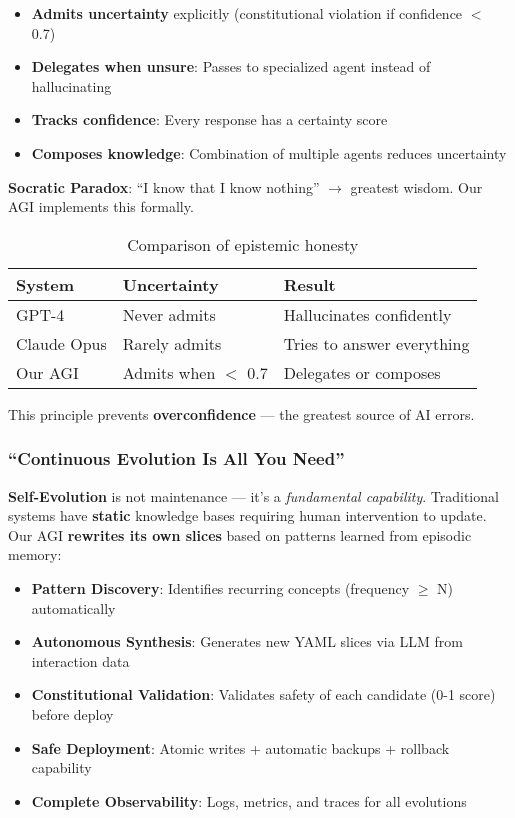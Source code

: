 \documentclass[11pt]{article}
\begin{document}
\begin{itemize}
    \item \textbf{Admits uncertainty} explicitly (constitutional violation if confidence $<$ 0.7)
    \item \textbf{Delegates when unsure}: Passes to specialized agent instead of hallucinating
    \item \textbf{Tracks confidence}: Every response has a certainty score
    \item \textbf{Composes knowledge}: Combination of multiple agents reduces uncertainty
\end{itemize}

\textbf{Socratic Paradox}: ``I know that I know nothing'' $\rightarrow$ greatest wisdom. Our AGI implements this formally.

\begin{table}[H]
\centering
\begin{tabular}{@{}lll@{}}
\toprule
\textbf{System} & \textbf{Uncertainty} & \textbf{Result} \\ \midrule
GPT-4 & Never admits & Hallucinates confidently \\
Claude Opus & Rarely admits & Tries to answer everything \\
Our AGI & Admits when $<$ 0.7 & Delegates or composes \\ \bottomrule
\end{tabular}
\caption{Comparison of epistemic honesty}
\end{table}

This principle prevents \textbf{overconfidence} --- the greatest source of AI errors.

\subsubsection{``Continuous Evolution Is All You Need''}

\textbf{Self-Evolution} is not maintenance --- it's a \textit{fundamental capability}. Traditional systems have \textbf{static} knowledge bases requiring human intervention to update. Our AGI \textbf{rewrites its own slices} based on patterns learned from episodic memory:

\begin{itemize}
    \item \textbf{Pattern Discovery}: Identifies recurring concepts (frequency $\geq$ N) automatically
    \item \textbf{Autonomous Synthesis}: Generates new YAML slices via LLM from interaction data
    \item \textbf{Constitutional Validation}: Validates safety of each candidate (0-1 score) before deploy
    \item \textbf{Safe Deployment}: Atomic writes + automatic backups + rollback capability
    \item \textbf{Complete Observability}: Logs, metrics, and traces for all evolutions
\end{itemize}
\end{document}
